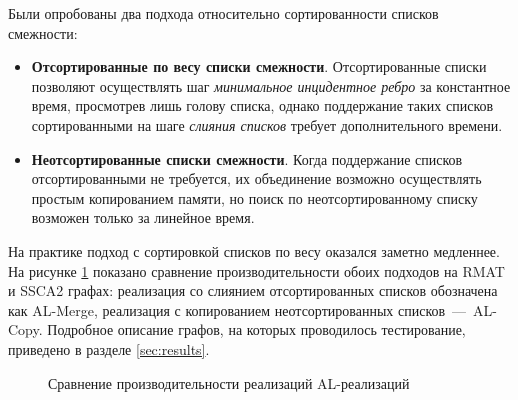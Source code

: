 \documentclass[a4paper,10pt]{extarticle}
\begin{document}
Были опробованы два подхода относительно сортированности списков смежности:
\begin{itemize}
    \item \textbf{Отсортированные по весу списки смежности}. 
        Отсортированные списки позволяют осуществлять шаг \textit{минимальное инцидентное ребро} за константное время, просмотрев лишь голову списка, однако поддержание таких списков сортированными на шаге \textit{слияния списков} требует дополнительного времени.
    \item \textbf{Неотсортированные списки смежности}.
        Когда поддержание списков отсортированными не требуется, их объединение возможно осуществлять простым копированием памяти, но поиск по неотсортированному списку возможен только за линейное время.
\end{itemize}

На практике подход с сортировкой списков по весу оказался заметно медленнее. 
На рисунке \ref{fig:BorvukaAlCmp} показано сравнение производительности обоих подходов на RMAT и SSCA2 графах: реализация со слиянием отсортированных списков обозначена как AL-Merge, реализация с копированием неотсортированных списков~---~AL-Copy. Подробное описание графов, на которых проводилось тестирование, приведено в разделе \ref{sec:results}.

\noindent \begin{figure}
\centering
{}
\caption{Сравнение производительности реализаций AL-реализаций}
\label{fig:BorvukaAlCmp}
\end{figure}
\end{document}
